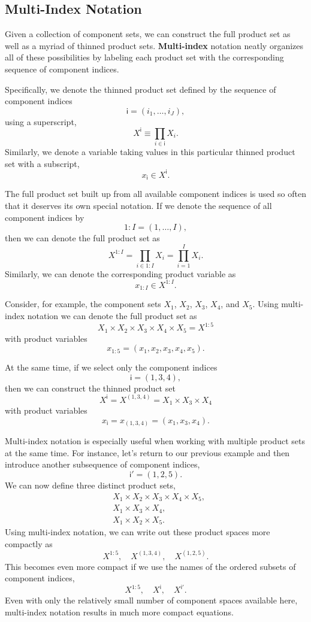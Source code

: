 \documentclass[
  letterpaper,
  DIV=11,
  numbers=noendperiod]{scrartcl}
\begin{document}
\subsection{Multi-Index Notation}\label{multi-index-notation}

Given a collection of component sets, we can construct the full product
set as well as a myriad of thinned product sets. \textbf{Multi-index}
notation neatly organizes all of these possibilities by labeling each
product set with the corresponding sequence of component indices.

Specifically, we denote the thinned product set defined by the sequence
of component indices \[
\mathsf{i}
=
( i_{1}, \ldots, i_{J} ),
\] using a superscript, \[
X^{ \mathsf{i} }
\equiv
\prod_{i \in \mathsf{i} } X_{i}.
\] Similarly, we denote a variable taking values in this particular
thinned product set with a subscript, \[
x_{ \mathsf{i} } \in X^{\mathsf{i}}.
\]

The full product set built up from all available component indices is
used so often that it deserves its own special notation. If we denote
the sequence of all component indices by \[
1 \! : \! I = ( 1, \ldots, I ),
\] then we can denote the full product set as \[
X^{1:I}
=
\prod_{i \in 1:I} X_{i}
=
\prod_{i = 1}^{I} X_{i}.
\] Similarly, we can denote the corresponding product variable as \[
x_{1:I} \in X^{1:I}.
\]

Consider, for example, the component sets \(X_{1}\), \(X_{2}\),
\(X_{3}\), \(X_{4}\), and \(X_{5}\). Using multi-index notation we can
denote the full product set as \[
X_{1} \times X_{2} \times X_{3} \times X_{4} \times X_{5}
=
X^{1:5}
\] with product variables \[
x_{1:5} = ( x_{1}, x_{2}, x_{3}, x_{4}, x_{5} ).
\]

At the same time, if we select only the component indices \[
\mathsf{i} = ( 1, 3, 4 ),
\] then we can construct the thinned product set \[
X^{ \mathsf{i} }
=
X^{ (1, 3, 4) }
=
X_{1} \times X_{3} \times X_{4}
\] with product variables \[
x_{ \mathsf{i} }
=
x_{ (1, 3, 4) }
=
( x_{1}, x_{3}, x_{4} ).
\]

Multi-index notation is especially useful when working with multiple
product sets at the same time. For instance, let's return to our
previous example and then introduce another subsequence of component
indices, \[
\mathsf{i}' = ( 1, 2, 5 ).
\] We can now define three distinct product sets, \begin{align*}
& X_{1} \times X_{2} \times X_{3} \times X_{4} \times X_{5},
\\
& X_{1} \times X_{3} \times X_{4},
\\
& X_{1} \times X_{2} \times X_{5}.
\end{align*} Using multi-index notation, we can write out these product
spaces more compactly as \[
X^{1:5}, \quad
X^{ (1, 3, 4) }, \quad
X^{ (1, 2, 5) }.
\] This becomes even more compact if we use the names of the ordered
subsets of component indices, \[
X^{1:5}, \quad
X^{ \mathsf{i} }, \quad
X^{ \mathsf{i}' }.
\] Even with only the relatively small number of component spaces
available here, multi-index notation results in much more compact
equations.
\end{document}
